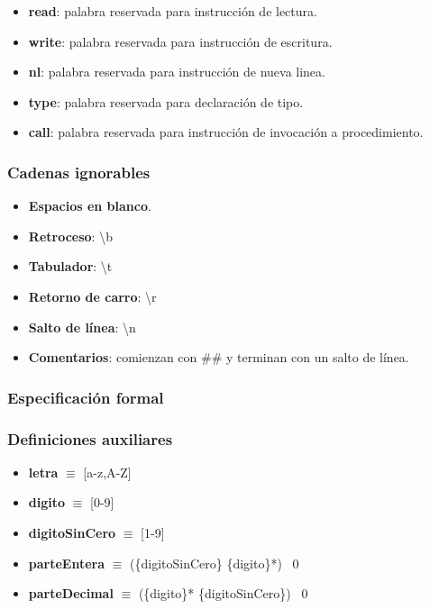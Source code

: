 \documentclass[11pt]{article}
\begin{document}
\begin{itemize}
\begin{itemize}
                    \item \textbf{read}: palabra reservada para instrucción de lectura.
                    \item \textbf{write}: palabra reservada para instrucción de escritura.
                    \item \textbf{nl}: palabra reservada para instrucción de nueva linea.
                    \item \textbf{type}: palabra reservada para declaración de tipo.
                    \item \textbf{call}: palabra reservada para instrucción de invocación a procedimiento.
                \end{itemize}
        \end{itemize}
        \subsubsection*{Cadenas ignorables}
        \begin{itemize}
            \item \textbf{Espacios en blanco}.
            \item \textbf{Retroceso}: \textbackslash b
            \item \textbf{Tabulador}: \textbackslash t
            \item \textbf{Retorno de carro}: \textbackslash r
            \item \textbf{Salto de línea}: \textbackslash n
            \item \textbf{Comentarios}: comienzan con \#\# y terminan con un salto de línea.
        \end{itemize}
        \subsubsection{Especificación formal}
        \subsubsection*{Definiciones auxiliares}
        \begin{itemize}
            \item \textbf{letra }$\equiv$ [a-z,A-Z]
            \item \textbf{digito }$\equiv$ [0-9]
            \item \textbf{digitoSinCero }$\equiv$ [1-9]
            \item \textbf{parteEntera }$\equiv$ (\{digitoSinCero\} \{digito\}*) \textbar\ 0
            \item \textbf{parteDecimal }$\equiv$ (\{digito\}* \{digitoSinCero\}) \textbar\ 0
        \end{itemize}
\end{document}
